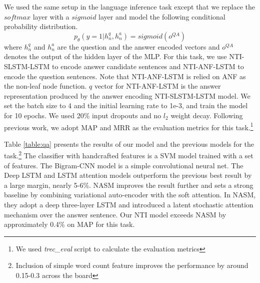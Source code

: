 \documentclass[11pt]{article}
\begin{document}
We used the same setup in the language inference task except that we replace the $softmax$ layer with a $sigmoid$ layer and model the following conditional probability distribution.
\begin{equation}
p_{\theta}(y=1|h^q_n,h^a_n) = sigmoid(o^{QA})
\end{equation}
where $h^q_n$ and $h^a_n$ are the question and the answer encoded vectors and $o^{QA}$ denotes the output of the hidden layer of the MLP. 
For this task, we use NTI-SLSTM-LSTM to encode answer candidate sentences and NTI-ANF-LSTM to encode the question sentences. Note that NTI-ANF-LSTM is relied on ANF as the non-leaf node function. $q$ vector for NTI-ANF-LSTM is the answer representation produced by the answer encoding NTI-SLSTM-LSTM model. We set the batch size to 4 and the initial learning rate to 1e-3, and train the model for 10 epochs. We used 20\% input dropouts and no $l_2$ weight decay. Following previous work, we adopt MAP and MRR as the evaluation metrics for this task.\footnote{We used \textit{trec\_eval} script to calculate the evaluation metrics}

Table \ref{table:qa} presents the results of our model and the previous models for the task.\footnote{Inclusion of simple word count feature improves the performance by around 0.15-0.3 across the board} The classifier with handcrafted features is a SVM model trained with a set of features. The Bigram-CNN model is a simple convolutional neural net. The Deep LSTM and LSTM attention models outperform the previous best result by a large margin, nearly 5-6\%. NASM improves the result further and sets a strong baseline by combining variational auto-encoder \cite{kingma2014auto} with the soft attention. In NASM, they adopt a deep three-layer LSTM and introduced a latent stochastic attention mechanism over the answer sentence. Our NTI model exceeds NASM by approximately 0.4\% on MAP for this task.
\end{document}
